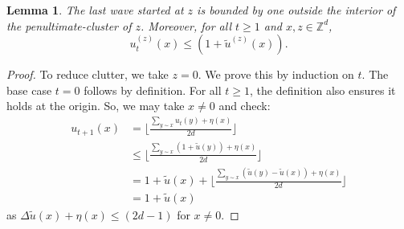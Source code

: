 \documentclass[aap]{imsart}
\newcommand{\Z}{\mathbb{Z}}
\newtheorem{lemma}[theorem]{Lemma}
\begin{document}
\begin{lemma} \label{lemma:last_wave_bound}
	The last wave started at $z$ is bounded by one outside the interior of the penultimate-cluster of $z$. Moreover, for all $t \geq 1$ and $x,z \in \Z^d$, 
	\[
	u_t^{(z)}(x) \leq (1 + \tilde{u}^{(z)}(x)).
	\]
\end{lemma}

\begin{proof}
	To reduce clutter, we take $z = 0$. We prove this by induction on $t$. 
	The base case $t=0$ follows by definition. For all $t \geq 1$, the definition also ensures it holds at the origin.
	So, we may take $x \not = 0$ and check:
	\begin{align*}
	u_{t+1}(x) &= \lfloor \frac{ \sum_{y \sim x}  u_{t}(y) + \eta(x)}{2 d} \rfloor \\
	&\leq \lfloor \frac{ \sum_{y \sim x} (1 + \tilde{u}(y)) + \eta(x)}{2 d} \rfloor \\
	&= 1 + \tilde{u}(x) + \lfloor \frac{ \sum_{y \sim x} (\tilde{u}(y)-\tilde{u}(x)) + \eta(x)}{2 d} \rfloor \\
	&= 1 + \tilde{u}(x)
	\end{align*}
	as $\Delta \tilde{u}(x) + \eta(x) \leq (2 d- 1)$ for $x \not = 0$. 
	
	
	
	
	
	
	
\end{proof}
\end{document}
